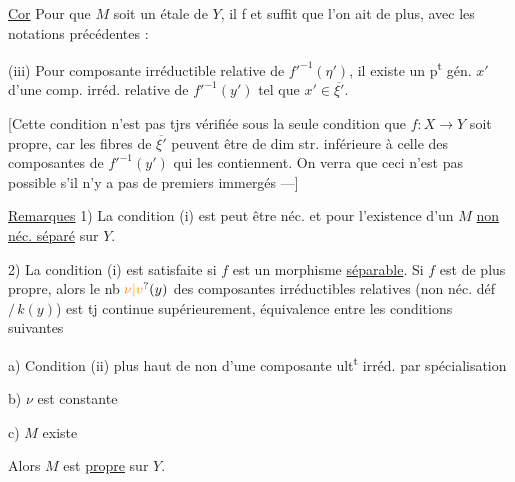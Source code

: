 \uline{Cor} Pour que $M$ soit un \uline{} étale de $Y$, il f et suffit que l'on ait de plus, avec les notations précédentes :

(iii)  Pour   composante irréductible relative  de $ {f'}^{-1}(\eta')$, il existe un p\textsuperscript{t} gén. $x'$ d'une comp. irréd. relative de $ {f'}^{-1}(y')$ tel que $x'\in\overline{\xi'}$.

[Cette condition n'est pas tjrs vérifiée sous la seule condition que $f:X\to Y$ soit propre, car  les fibres de $\overline{\xi'}$ peuvent être de dim str. inférieure à celle des composantes de $ {f'}^{-1}(y')$ qui les contiennent. On verra que ceci n'est pas possible s'il n'y a pas de  premiers immergés ---]

\uline{Remarques} 1) La condition (i) est peut être néc. et  pour l'existence d'un \uline{$M$} \uline{non néc. séparé} sur $Y$.

2) La condition (i)  est satisfaite si $f$ est un morphisme \uline{séparable}. Si $f$ est de plus propre, alors  le nb $\unsure{\nu|v}(y)$ des composantes irréductibles relatives (non néc. déf $/\,k(y)$) est tj continue supérieurement,     équivalence entre les conditions suivantes

a) Condition (ii) plus haut de non  d'une composante ult\textsuperscript{t} irréd. par spécialisation

b) $\nu$ est  constante

c) $M$ existe

 Alors $M$ est \uline{propre} sur $Y$.

